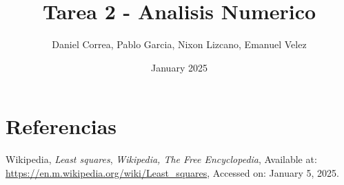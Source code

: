\documentclass{article}
\title{Tarea 2 - Analisis Numerico}
\author{Daniel Correa, Pablo Garcia, Nixon Lizcano, Emanuel Velez}
\date{January 2025}
\begin{document}
\maketitle





\section{Referencias}
\begingroup
\renewcommand{\section}[2]{}
\begin{thebibliography}{0}
\setlength{\parskip}{0mm}
\setlength{\itemsep}{-0.3mm}
\small

 Wikipedia, \textit{Least squares}, 
\textit{Wikipedia, The Free Encyclopedia}, 
Available at: \url{https://en.m.wikipedia.org/wiki/Least_squares}, 
Accessed on: January 5, 2025.


\end{thebibliography}
\endgroup
\end{document}
